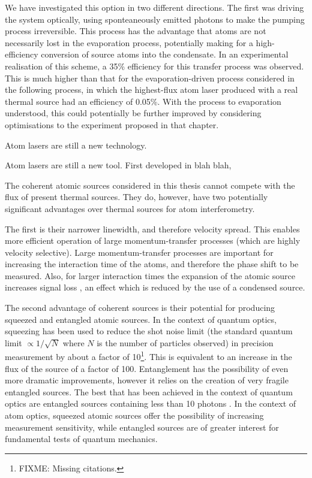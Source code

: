We have investigated this option in two different directions.  The first was driving the system optically, using sponteaneously emitted photons to make the pumping process irreversible.  This process has the advantage that atoms are not necessarily lost in the evaporation process, potentially making for a high-efficiency conversion of source atoms into the condensate.  In an experimental realisation of this scheme, a 35\% efficiency for this transfer process was observed.  This is much higher than that for the evaporation-driven process considered in the following process, in which the highest-flux atom laser produced with a real thermal source had an efficiency of 0.05\%.  With the process to evaporation understood, this could potentially be further improved by considering optimisations to the experiment proposed in that chapter.



Atom lasers are still a new technology.  



Atom lasers are still a new tool.  First developed in blah blah, 















The coherent atomic sources considered in this thesis cannot compete with the flux of present thermal sources.  They do, however, have two potentially significant advantages over thermal sources for atom interferometry.

The first is their narrower linewidth, and therefore velocity spread.  This enables more efficient operation of large momentum-transfer processes (which are highly velocity selective).  Large momentum-transfer processes are important for increasing the interaction time of the atoms, and therefore the phase shift to be measured.  Also, for larger interaction times the expansion of the atomic source increases signal loss \citep{Dimopoulos:2007uq}, an effect which is reduced by the use of a condensed source.

The second advantage of coherent sources is their potential for producing squeezed and entangled atomic sources.  In the context of quantum optics, squeezing has been used to reduce the shot noise limit (the standard quantum limit $\propto 1/\sqrt{N}$ where $N$ is the number of particles observed) in precision measurement by about a factor of 10\footnote{FIXME: Missing citations.}.  This is equivalent to an increase in the flux of the source of a factor of 100.  Entanglement has the possibility of even more dramatic improvements, however it relies on the creation of very fragile entangled sources.  The best that has been achieved in the context of quantum optics are entangled sources containing less than 10 photons \citep{Leibfried:2004}.  In the context of atom optics, squeezed atomic sources offer the possibility of increasing measurement sensitivity, while entangled sources are of greater interest for fundamental tests of quantum mechanics.

